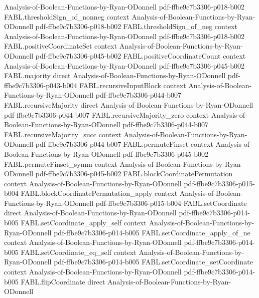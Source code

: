 \begin{theorem}
  {Analysis-of-Boolean-Functions-by-Ryan-ODonnell}
  {pdf-ffbe9c7b3306-p018-b002}
\proofstep
  {FABL.thresholdSign_of_nonneg}
  {context}
  {Analysis-of-Boolean-Functions-by-Ryan-ODonnell}
  {pdf-ffbe9c7b3306-p018-b002}
\proofstep
  {FABL.thresholdSign_of_neg}
  {context}
  {Analysis-of-Boolean-Functions-by-Ryan-ODonnell}
  {pdf-ffbe9c7b3306-p018-b002}
\proofstep
  {FABL.positiveCoordinateSet}
  {context}
  {Analysis-of-Boolean-Functions-by-Ryan-ODonnell}
  {pdf-ffbe9c7b3306-p045-b002}
\proofstep
  {FABL.positiveCoordinateCount}
  {context}
  {Analysis-of-Boolean-Functions-by-Ryan-ODonnell}
  {pdf-ffbe9c7b3306-p045-b002}
\proofstep
  {FABL.majority}
  {direct}
  {Analysis-of-Boolean-Functions-by-Ryan-ODonnell}
  {pdf-ffbe9c7b3306-p043-b004}
\proofstep
  {FABL.recursiveInputBlock}
  {context}
  {Analysis-of-Boolean-Functions-by-Ryan-ODonnell}
  {pdf-ffbe9c7b3306-p044-b007}
\proofstep
  {FABL.recursiveMajority}
  {direct}
  {Analysis-of-Boolean-Functions-by-Ryan-ODonnell}
  {pdf-ffbe9c7b3306-p044-b007}
\proofstep
  {FABL.recursiveMajority_zero}
  {context}
  {Analysis-of-Boolean-Functions-by-Ryan-ODonnell}
  {pdf-ffbe9c7b3306-p044-b007}
\proofstep
  {FABL.recursiveMajority_succ}
  {context}
  {Analysis-of-Boolean-Functions-by-Ryan-ODonnell}
  {pdf-ffbe9c7b3306-p044-b007}
\proofstep
  {FABL.permuteFinset}
  {context}
  {Analysis-of-Boolean-Functions-by-Ryan-ODonnell}
  {pdf-ffbe9c7b3306-p045-b002}
\proofstep
  {FABL.permuteFinset_symm}
  {context}
  {Analysis-of-Boolean-Functions-by-Ryan-ODonnell}
  {pdf-ffbe9c7b3306-p045-b002}
\proofstep
  {FABL.blockCoordinatePermutation}
  {context}
  {Analysis-of-Boolean-Functions-by-Ryan-ODonnell}
  {pdf-ffbe9c7b3306-p015-b004}
\proofstep
  {FABL.blockCoordinatePermutation_apply}
  {context}
  {Analysis-of-Boolean-Functions-by-Ryan-ODonnell}
  {pdf-ffbe9c7b3306-p015-b004}
\proofstep
  {FABL.setCoordinate}
  {direct}
  {Analysis-of-Boolean-Functions-by-Ryan-ODonnell}
  {pdf-ffbe9c7b3306-p014-b005}
\proofstep
  {FABL.setCoordinate_apply_self}
  {context}
  {Analysis-of-Boolean-Functions-by-Ryan-ODonnell}
  {pdf-ffbe9c7b3306-p014-b005}
\proofstep
  {FABL.setCoordinate_apply_of_ne}
  {context}
  {Analysis-of-Boolean-Functions-by-Ryan-ODonnell}
  {pdf-ffbe9c7b3306-p014-b005}
\proofstep
  {FABL.setCoordinate_eq_self}
  {context}
  {Analysis-of-Boolean-Functions-by-Ryan-ODonnell}
  {pdf-ffbe9c7b3306-p014-b005}
\proofstep
  {FABL.setCoordinate_setCoordinate}
  {context}
  {Analysis-of-Boolean-Functions-by-Ryan-ODonnell}
  {pdf-ffbe9c7b3306-p014-b005}
\proofstep
  {FABL.flipCoordinate}
  {direct}
  {Analysis-of-Boolean-Functions-by-Ryan-ODonnell}

\end{theorem}
